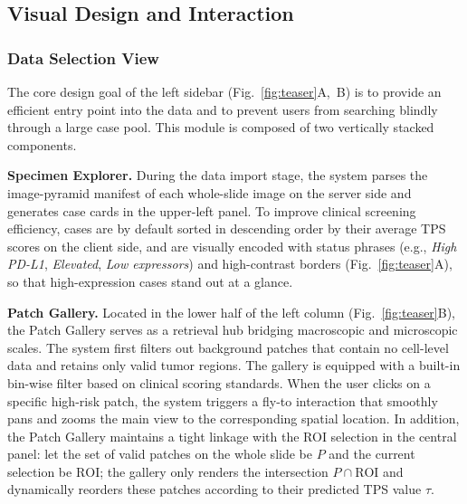\documentclass[journal]{vgtc}                     %
\begin{document}
\subsection{Visual Design and Interaction}

\subsubsection{Data Selection View}

The core design goal of the left sidebar (Fig.~\ref{fig:teaser}A,~B) is to provide an efficient entry point into the data and to prevent users from searching blindly through a large case pool. This module is composed of two vertically stacked components.

\textbf{Specimen Explorer.} During the data import stage, the system parses the image-pyramid manifest of each whole-slide image on the server side and generates case cards in the upper-left panel. To improve clinical screening efficiency, cases are by default sorted in descending order by their average TPS scores on the client side, and are visually encoded with status phrases (e.g., \textit{High PD-L1}, \textit{Elevated}, \textit{Low expressors}) and high-contrast borders (Fig.~\ref{fig:teaser}A), so that high-expression cases stand out at a glance.

\textbf{Patch Gallery.} Located in the lower half of the left column (Fig.~\ref{fig:teaser}B), the Patch Gallery serves as a retrieval hub bridging macroscopic and microscopic scales. The system first filters out background patches that contain no cell-level data and retains only valid tumor regions. The gallery is equipped with a built-in bin-wise filter based on clinical scoring standards. When the user clicks on a specific high-risk patch, the system triggers a fly-to interaction that smoothly pans and zooms the main view to the corresponding spatial location. In addition, the Patch Gallery maintains a tight linkage with the ROI selection in the central panel: let the set of valid patches on the whole slide be $P$ and the current selection be $\mathrm{ROI}$; the gallery only renders the intersection $P \cap \mathrm{ROI}$ and dynamically reorders these patches according to their predicted TPS value $\tau$.
\end{document}
